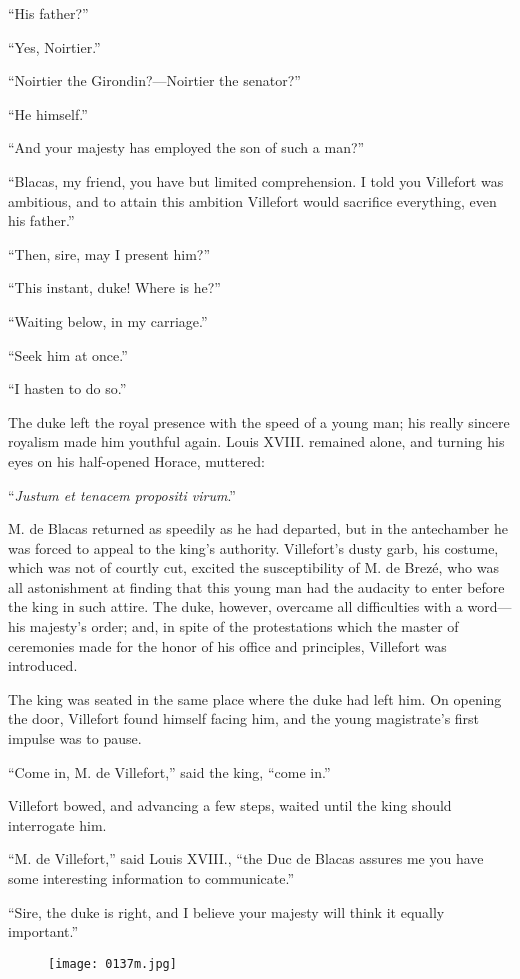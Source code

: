 “His father?”

“Yes, Noirtier.”

“Noirtier the Girondin?—Noirtier the senator?”

“He himself.”

“And your majesty has employed the son of such a man?”

“Blacas, my friend, you have but limited comprehension. I told you
Villefort was ambitious, and to attain this ambition Villefort would
sacrifice everything, even his father.”

“Then, sire, may I present him?”

“This instant, duke! Where is he?”

“Waiting below, in my carriage.”

“Seek him at once.”

“I hasten to do so.”

The duke left the royal presence with the speed of a young man; his
really sincere royalism made him youthful again. Louis XVIII. remained
alone, and turning his eyes on his half-opened Horace, muttered:

“\textit{Justum et tenacem propositi virum}.”

M. de Blacas returned as speedily as he had departed, but in the
antechamber he was forced to appeal to the king’s authority.
Villefort’s dusty garb, his costume, which was not of courtly cut,
excited the susceptibility of M. de Brezé, who was all astonishment at
finding that this young man had the audacity to enter before the king
in such attire. The duke, however, overcame all difficulties with a
word—his majesty’s order; and, in spite of the protestations which the
master of ceremonies made for the honor of his office and principles,
Villefort was introduced.

The king was seated in the same place where the duke had left him. On
opening the door, Villefort found himself facing him, and the young
magistrate’s first impulse was to pause.

“Come in, M. de Villefort,” said the king, “come in.”

Villefort bowed, and advancing a few steps, waited until the king
should interrogate him.

“M. de Villefort,” said Louis XVIII., “the Duc de Blacas assures me you
have some interesting information to communicate.”

“Sire, the duke is right, and I believe your majesty will think it
equally important.”

\begin{figure}[ht]
\texttt{[image: 0137m.jpg]}
\end{figure}

